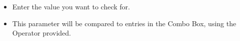 \begin{itemize}
\item Enter the value you want to check for.
\item This parameter will be compared to entries in the Combo Box, using the Operator provided.
\end{itemize}
